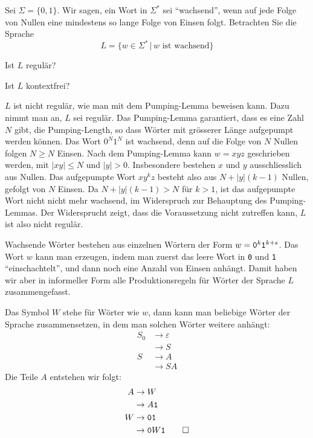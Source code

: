 Sei $\Sigma=\{0,1\}$.
Wir sagen, ein Wort in $\Sigma^*$ sei ``wachsend'',
wenn auf jede Folge von Nullen eine mindestens
so lange Folge von Einsen folgt.
Betrachten Sie die Sprache
\[
L=\{
w\in \Sigma^*\,|\, \text{$w$ ist wachsend}
\}
\]
\begin{teilaufgaben}
\item Ist $L$ regulär?
\item Ist $L$ kontextfrei?
\end{teilaufgaben}

\begin{loesung}
\begin{teilaufgaben}
\item
$L$ ist nicht regulär, wie man mit dem Pumping-Lemma beweisen kann.
Dazu nimmt man an, $L$ sei regulär. Das Pumping-Lemma garantiert, dass
es eine Zahl $N$ gibt, die Pumping-Length, so dass Wörter mit grösserer
Länge aufgepumpt werden können. Das Wort $0^N1^N$ ist wachsend, denn
auf die Folge von $N$ Nullen folgen $N\ge N$ Einsen. Nach dem Pumping-Lemma
kann $w=xyz$ geschrieben werden, mit $|xy|\le N$ und $|y|>0$. Insbesondere bestehen
$x$ und $y$ ausschliesslich aus Nullen. Das aufgepumpte Wort
$xy^kz$ besteht also aus $N+|y|(k-1)$ Nullen, gefolgt von $N$ Einsen.
Da $N+|y|(k-1) > N$ für $k>1$, ist das aufgepumpte Wort nicht nicht
mehr wachsend, im Widerspruch zur Behauptung des Pumping-Lemmas. Der
Widersprucht zeigt, dass die Voraussetzung nicht zutreffen kann, $L$
ist also nicht regulär.
\item
Wachsende Wörter bestehen aus einzelnen Wörtern der Form
$w={\tt 0}^k{\tt 1}^{k+s}$.  Das Wort $w$ kann man erzeugen,
indem man zuerst das leere Wort in {\tt 0} und {\tt 1}
``einschachtelt'', und dann noch eine Anzahl von Einsen anhängt.
Damit haben wir aber in informeller Form alle Produktionsregeln
für Wörter der Sprache $L$ zusammengefasst.

Das Symbol $W$ stehe für Wörter wie $w$, dann kann man beliebige Wörter der
Sprache zusammensetzen, in dem man solchen Wörter weitere anhängt:
\begin{align*}
S_0&\to \varepsilon\\
   &\to S\\
S&\to A\\
 &\to SA
\end{align*}
Die Teile $A$ entstehen wir folgt:
\begin{align*}
A&\to W\\
 &\to A{\tt 1}\\
W&\to {\tt01}\\
 &\to {\tt 0}W{\tt 1}
\qedhere
\end{align*}
\end{teilaufgaben}
\end{loesung}
